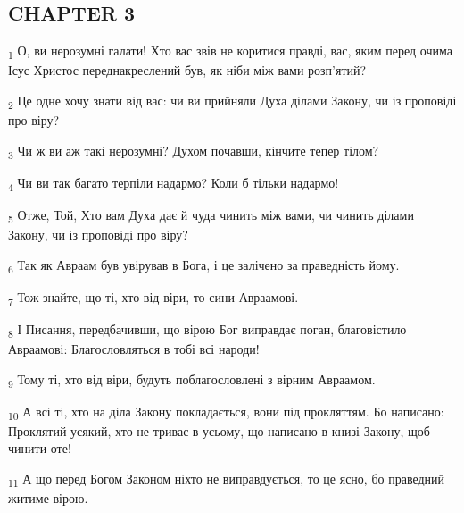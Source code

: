\subsection{CHAPTER 3}
\begin{tcolorbox}
\textsubscript{1} О, ви нерозумні галати! Хто вас звів не коритися правді, вас, яким перед очима Ісус Христос переднакреслений був, як ніби між вами розп'ятий?
\end{tcolorbox}
\begin{tcolorbox}
\textsubscript{2} Це одне хочу знати від вас: чи ви прийняли Духа ділами Закону, чи із проповіді про віру?
\end{tcolorbox}
\begin{tcolorbox}
\textsubscript{3} Чи ж ви аж такі нерозумні? Духом почавши, кінчите тепер тілом?
\end{tcolorbox}
\begin{tcolorbox}
\textsubscript{4} Чи ви так багато терпіли надармо? Коли б тільки надармо!
\end{tcolorbox}
\begin{tcolorbox}
\textsubscript{5} Отже, Той, Хто вам Духа дає й чуда чинить між вами, чи чинить ділами Закону, чи із проповіді про віру?
\end{tcolorbox}
\begin{tcolorbox}
\textsubscript{6} Так як Авраам був увірував в Бога, і це залічено за праведність йому.
\end{tcolorbox}
\begin{tcolorbox}
\textsubscript{7} Тож знайте, що ті, хто від віри, то сини Авраамові.
\end{tcolorbox}
\begin{tcolorbox}
\textsubscript{8} І Писання, передбачивши, що вірою Бог виправдає поган, благовістило Авраамові: Благословляться в тобі всі народи!
\end{tcolorbox}
\begin{tcolorbox}
\textsubscript{9} Тому ті, хто від віри, будуть поблагословлені з вірним Авраамом.
\end{tcolorbox}
\begin{tcolorbox}
\textsubscript{10} А всі ті, хто на діла Закону покладається, вони під прокляттям. Бо написано: Проклятий усякий, хто не триває в усьому, що написано в книзі Закону, щоб чинити оте!
\end{tcolorbox}
\begin{tcolorbox}
\textsubscript{11} А що перед Богом Законом ніхто не виправдується, то це ясно, бо праведний житиме вірою.
\end{tcolorbox}
